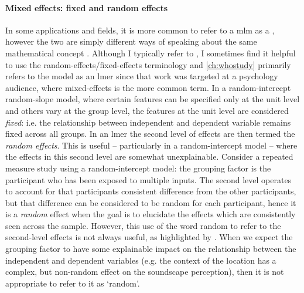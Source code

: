 \paragraph*{Mixed effects: fixed and random effects} In some applications and fields, it is more common to refer to a \gls{mlm} as a , however the two are simply different ways of speaking about the same mathematical concept \citep{Pinheiro2000Linear,Gelman2006Multilevel}. Although I typically refer to , I sometimes find it helpful to use the random-effects/fixed-effects terminology and \cref{ch:whostudy} primarily refers to the model as an \gls{lmer} since that work was targeted at a psychology audience, where mixed-effects is the more common term. In a random-intercept random-slope model, where certain features can be specified only at the unit level and others vary at the group level, the features at the unit level are considered \emph{fixed}: i.e. the relationship between independent and dependent variable remains fixed across all groups. In an \gls{lmer} the second level of effects are then termed the \emph{random effects}. This is useful -- particularly in a random-intercept model -- where the effects in this second level are somewhat unexplainable. Consider a repeated measure study using a random-intercept model: the grouping factor is the participant who has been exposed to multiple inputs. The second level operates to account for that participants consistent difference from the other participants, but that difference can be considered to be random for each participant, hence it is a \emph{random} effect when the goal is to elucidate the effects which are consistently seen across the sample. However, this use of the word random to refer to the second-level effects is not always useful, as highlighted by \citet[pg. 2]{Gelman2006Multilevel}. When we expect the grouping factor to have some explainable impact on the relationship between the independent and dependent variables (e.g. the context of the location has a complex, but non-random effect on the soundscape perception), then it is not appropriate to refer to it as `random'. 

